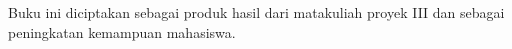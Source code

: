 Buku ini diciptakan sebagai produk hasil dari matakuliah proyek III dan sebagai peningkatan kemampuan mahasiswa.

